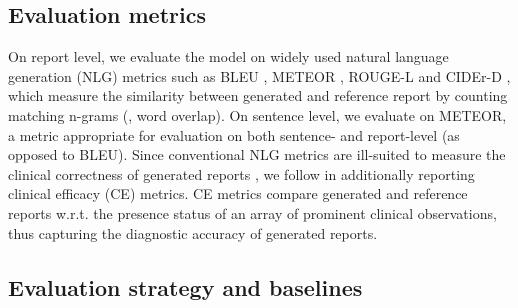 \documentclass[10pt,twocolumn,letterpaper]{article}
\begin{document}
\subsection{Evaluation metrics}
On report level, we evaluate the model on widely used natural language generation (NLG) metrics such as BLEU \cite{papineni2002bleu}, METEOR \cite{banerjee2005meteor}, ROUGE-L \cite{lin2004rouge} and CIDEr-D \cite{vedantam2015cider}, which measure the similarity between generated and reference report by counting matching n-grams (\ie, word overlap). On sentence level, we evaluate on METEOR, a metric appropriate for evaluation on both sentence- and report-level (as opposed to \eg BLEU). Since conventional NLG metrics are ill-suited to measure the clinical correctness of generated reports \cite{boag2020baselines, liu2019clinically, pino2020inspecting}, we follow \cite{liu2019clinically, chen2020generating, miura2021improving, nicolson2022improving} in additionally reporting clinical efficacy (CE) metrics. CE metrics compare generated and reference reports w.r.t. the presence status of an array of prominent clinical observations, thus capturing the diagnostic accuracy of generated reports.

\subsection{Evaluation strategy and baselines}
\end{document}
